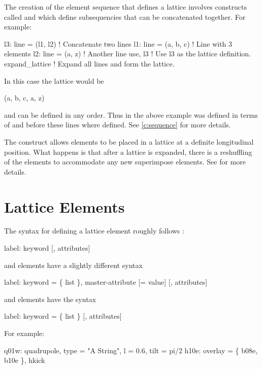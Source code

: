 {
The creation of the element sequence that defines a lattice involves
constructs called  and  which define subsequencies
that can be concatenated together. For example:
\begin{example}
  l3: line = (l1, l2)   ! Concatenate two lines
  l1: line = (a, b, c)  ! Line with 3 elements
  l2: line = (a, z)     ! Another line 
  use, l3               ! Use l3 as the lattice definition.
  expand_lattice        ! Expand all lines and form the lattice.
\end{example}
In this case the lattice would be
\begin{example}
  (a, b, c, a, z)
\end{example}
 and  can be defined in any order. Thus in the
above example  was defined in terms of  and 
before these lines where defined. See \cref{c:sequence} for more details.

The  construct allows elements to be placed in a
lattice at a definite longitudinal position. What happens is that
after a lattice is expanded, there is a reshuffling of the elements to
accommodate any new superimpose elements. See  for more
details.

\section{Lattice Elements}

The syntax for defining a lattice element roughly follows \mad:
\begin{example}
  label: keyword [, attributes]
\end{example}
 and  elements have a slightly different syntax
\begin{example}
  label: keyword = \{ list \}, master-attribute [= value] [, attributes]
\end{example}
and  elements have the syntax
\begin{example}
  label: keyword = \{ list \} [, attributes]
\end{example}  
For example:
\begin{example}
  q01w: quadrupole, type = "A String", l = 0.6, tilt = pi/2
  h10e: overlay = \{ b08e, b10e \}, hkick
\end{example}

}
